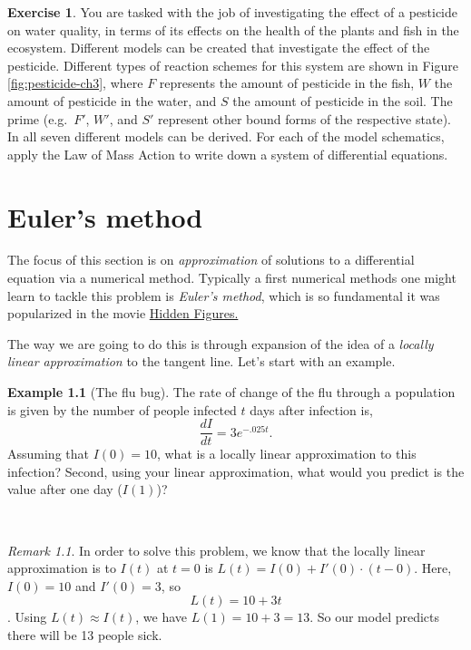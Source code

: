 \documentclass[
]{book}
\theoremstyle{definition}
\theoremstyle{definition}
\newtheorem{example}{Example}[chapter]
\theoremstyle{definition}
\newtheorem{exercise}{Exercise}[chapter]
\theoremstyle{remark}
\newtheorem*{remark}{Remark}
\begin{document}
\begin{exercise}
\protect\hypertarget{exr:unnamed-chunk-60}{}{\label{exr:unnamed-chunk-60} }You are tasked with the job of investigating the effect of a pesticide on water quality, in terms of its effects on the health of the plants and fish in the ecosystem. Different models can be created that investigate the effect of the pesticide. Different types of reaction schemes for this system are shown in Figure \ref{fig:pesticide-ch3}, where \(F\) represents the amount of pesticide in the fish, \(W\) the amount of pesticide in the water, and \(S\) the amount of pesticide in the soil. The prime (e.g.~\(F'\), \(W'\), and \(S'\) represent other bound forms of the respective state). In all seven different models can be derived. For each of the model schematics, apply the Law of Mass Action to write down a system of differential equations.
\end{exercise}

\hypertarget{euler-04}{%
\chapter{Euler's method}\label{euler-04}}

The focus of this section is on \emph{approximation} of solutions to a differential equation via a numerical method. Typically a first numerical methods one might learn to tackle this problem is \emph{Euler's method}, which is so fundamental it was popularized in the movie \href{https://www.youtube.com/watch?v=v-pbGAts_Fg}{Hidden Figures.}

The way we are going to do this is through expansion of the idea of a \emph{locally linear approximation} to the tangent line. Let's start with an example.

\begin{example}[The flu bug]
\protect\hypertarget{exm:flu-linear}{}{\label{exm:flu-linear} {} }The rate of change of the flu through a population is given by the number of people infected \(t\) days after infection is, \[\displaystyle \frac{dI}{dt} = 3e^{-.025t}. \] Assuming that \(I(0)=10\), what is a locally linear approximation to this infection? Second, using your linear approximation, what would you predict is the value after one day (\(I(1)\))?
\end{example}

~

\begin{remark}
{}In order to solve this problem, we know that the locally linear approximation is to \(I(t)\) at \(t=0\) is \(L(t) = I(0) + I'(0) \cdot (t-0)\). Here, \(I(0)=10\) and \(I'(0)=3\), so \[L(t) = 10 +3t\]. Using \(L(t) \approx I(t)\), we have \(L(1)=10 + 3 = 13\). So our model predicts there will be 13 people sick.
\end{remark}
\end{document}
